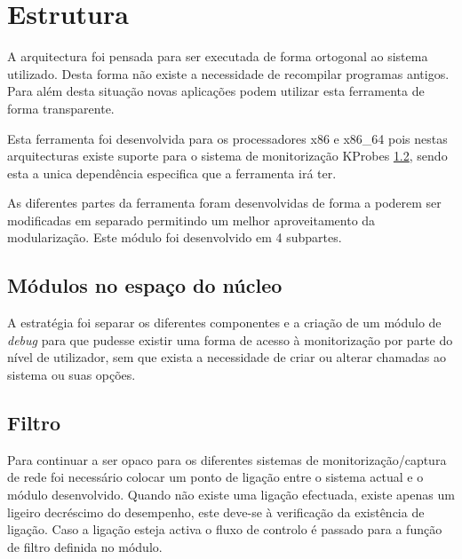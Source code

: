 \chapter{Estrutura}
\label{cap:Estrutura}


A arquitectura foi pensada para ser executada de forma ortogonal ao sistema
utilizado. Desta forma não existe a necessidade de recompilar programas
antigos. Para além desta situação novas aplicações podem utilizar esta
ferramenta de forma transparente.

Esta ferramenta foi desenvolvida para os processadores x86 e x86\_64 pois nestas
arquitecturas existe suporte para o sistema de monitorização KProbes \ref{},
sendo esta a unica dependência especifica que a ferramenta irá ter.

As diferentes partes da ferramenta foram desenvolvidas de forma a poderem ser
modificadas em separado permitindo um melhor aproveitamento da modularização.
Este módulo foi desenvolvido em 4 subpartes. 

\section{Módulos no espaço do núcleo}

A estratégia foi separar os diferentes componentes e a criação de um módulo de \textit{debug} para que pudesse existir uma forma de acesso à monitorização por parte do nível de utilizador, sem que exista a necessidade de criar ou alterar chamadas ao sistema ou suas opções.

\section{Filtro}

Para continuar a ser opaco para os diferentes sistemas de monitorização/captura de rede foi necessário colocar um ponto de ligação entre o sistema actual e o módulo desenvolvido. Quando não existe uma ligação efectuada, existe apenas um ligeiro decréscimo do desempenho, este deve-se à verificação da existência de ligação. Caso a ligação esteja activa o fluxo de controlo é passado para a função de filtro definida no módulo.


